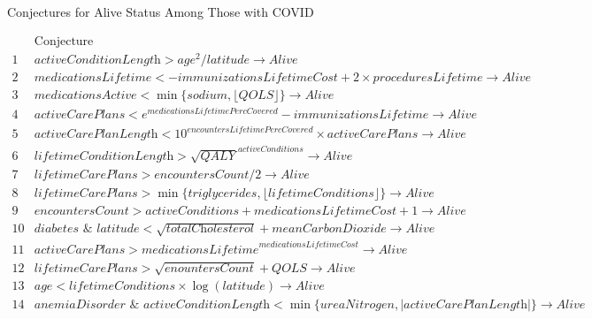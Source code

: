\documentclass[ijds,nonblindrev]{informs-ijds}
\begin{document}
\begin{APPENDICES}
\begin{table}[!ht]
\caption{\label{alive}Conjectures for Alive Status Among Those with COVID}
{\footnotesize
\[
 \begin{array}{lr} 
& \textrm{Conjecture}  \\
 \hline\hline
 1&  \textit{activeConditionLength} > \textit{age}^2/\textit{latitude} \rightarrow \textit{Alive}  \\ 
 2&  \textit{medicationsLifetime} < -\textit{immunizationsLifetimeCost} + 2 \times \textit{proceduresLifetime} \rightarrow \textit{Alive}  \\ 
 3&  \textit{medicationsActive} < \min\{\textit{sodium},\lfloor \textit{QOLS}\rfloor\} \rightarrow \textit{Alive}  \\ 
 4&  \textit{activeCarePlans} < e^{\textit{medicationsLifetimePercCovered}} - \textit{immunizationsLifetime} \rightarrow \textit{Alive}  \\ 
 5&  \textit{activeCarePlanLength} < 10^\textit{encountersLifetimePercCovered} \times \textit{activeCarePlans} \rightarrow \textit{Alive}  \\ 
 6&  \textit{lifetimeConditionLength} > \sqrt{\textit{QALY}}^\textit{activeConditions} \rightarrow \textit{Alive}  \\ 
 7&  \textit{lifetimeCarePlans} > \textit{encountersCount}/2  \rightarrow \textit{Alive}  \\ 
 8 & \textit{lifetimeCarePlans} > \min\{\textit{triglycerides}, \lfloor \textit{lifetimeConditions}\rfloor\} \rightarrow \textit{Alive}  \\ 
 9&  \textit{encountersCount} > \textit{activeConditions} + \textit{medicationsLifetimeCost} + 1 \rightarrow \textit{Alive}  \\ 
 10&  \textit{diabetes } \& \textit{ latitude} < \sqrt{\textit{totalCholesterol}} + \textit{meanCarbonDioxide} \rightarrow \textit{Alive}  \\ 
 11&  \textit{activeCarePlans} > \textit{medicationsLifetime}^\textit{medicationsLifetimeCost}  \rightarrow \textit{Alive}  \\ 
 12&  \textit{lifetimeCarePlans} > \sqrt{\textit{enountersCount}} +  \textit{QOLS} \rightarrow \textit{Alive}  \\ 
 13&  \textit{age} < \textit{lifetimeConditions} \times \log(\textit{latitude})  \rightarrow \textit{Alive}  \\ 
 14&  \textit{anemiaDisorder } \& \textit{ activeConditionLength} < \min \{\textit{ureaNitrogen}, |\textit{activeCarePlanLength}|\} \rightarrow \textit{Alive}  \\ 

\end{array}\]}
\end{table}
\end{APPENDICES}
\end{document}
